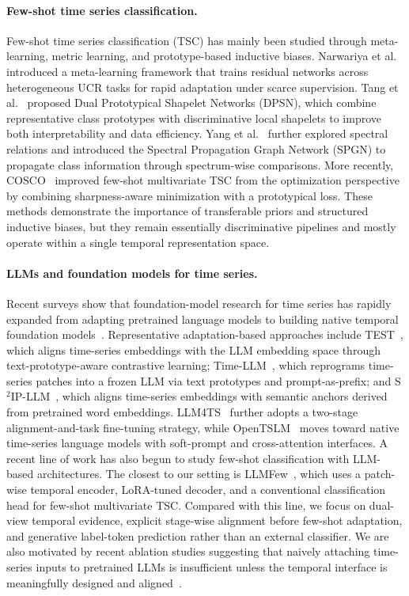 \documentclass{article}
\begin{document}
    \paragraph{Few-shot time series classification.}
    Few-shot time series classification (TSC) has mainly been studied through meta-learning, metric learning, and prototype-based inductive biases. Narwariya et al.~\cite{narwariya2020meta} introduced a meta-learning framework that trains residual networks across heterogeneous UCR tasks for rapid adaptation under scarce supervision. Tang et al.~\cite{tang2020interpretable} proposed Dual Prototypical Shapelet Networks (DPSN), which combine representative class prototypes with discriminative local shapelets to improve both interpretability and data efficiency. Yang et al.~\cite{yang2022spectral} further explored spectral relations and introduced the Spectral Propagation Graph Network (SPGN) to propagate class information through spectrum-wise comparisons. More recently, COSCO~\cite{barreda2024cosco} improved few-shot multivariate TSC from the optimization perspective by combining sharpness-aware minimization with a prototypical loss. These methods demonstrate the importance of transferable priors and structured inductive biases, but they remain essentially discriminative pipelines and mostly operate within a single temporal representation space.
    
    \paragraph{LLMs and foundation models for time series.}
    Recent surveys show that foundation-model research for time series has rapidly expanded from adapting pretrained language models to building native temporal foundation models~\cite{jiang2024empowering,ye2024survey,shi2025large}. Representative adaptation-based approaches include TEST~\cite{sun2023test}, which aligns time-series embeddings with the LLM embedding space through text-prototype-aware contrastive learning; Time-LLM~\cite{jin2024time}, which reprograms time-series patches into a frozen LLM via text prototypes and prompt-as-prefix; and S$^2$IP-LLM~\cite{pan2024s}, which aligns time-series embeddings with semantic anchors derived from pretrained word embeddings. LLM4TS~\cite{chang2025llm4ts} further adopts a two-stage alignment-and-task fine-tuning strategy, while OpenTSLM~\cite{langer2025opentslm} moves toward native time-series language models with soft-prompt and cross-attention interfaces. A recent line of work has also begun to study few-shot classification with LLM-based architectures. The closest to our setting is LLMFew~\cite{chen2025large}, which uses a patch-wise temporal encoder, LoRA-tuned decoder, and a conventional classification head for few-shot multivariate TSC. Compared with this line, we focus on dual-view temporal evidence, explicit stage-wise alignment before few-shot adaptation, and generative label-token prediction rather than an external classifier. We are also motivated by recent ablation studies suggesting that naively attaching time-series inputs to pretrained LLMs is insufficient unless the temporal interface is meaningfully designed and aligned~\cite{tan2024language}.
    
\end{document}
